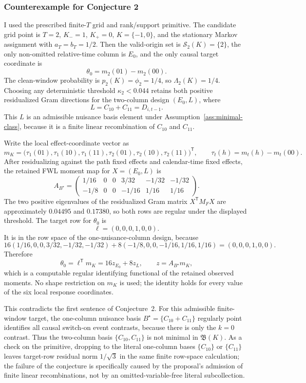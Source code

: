 \documentclass[11pt]{article}
\newcommand{\transpose}{\mathsf{T}}
\theoremstyle{definition}
\theoremstyle{plain}
\theoremstyle{remark}
\begin{document}
\subsubsection*{Counterexample for Conjecture 2}
I used the prescribed finite-\(T\) grid and rank/support primitive.
The candidate grid point is \(T=2\), \(K_- =1\), \(K_+=0\), \(K=\{-1,0\}\), and the stationary Markov assignment with \(a_T=b_T=1/2\).
Then the valid-origin set is \(\mathcal S_2(K)=\{2\}\), the only non-omitted relative-time column is \(E_0\), and the only causal target coordinate is
\[
\theta_0=m_2(01)-m_2(00).
\]
The clean-window probability is \(p_2(K)=\phi_2=1/4\), so \(\Lambda_2(K)=1/4\).
Choosing any deterministic threshold \(\kappa_2<0.044\) retains both positive residualized Gram directions for the two-column design \((E_0,L)\), where
\[
L=C_{10}+C_{11}=D_{i,t-1}.
\]
This \(L\) is an admissible nuisance basis element under Assumption~\ref{ass:minimal-class}, because it is a finite linear recombination of \(C_{10}\) and \(C_{11}\).

Write the local effect-coordinate vector as
\[
m_K=
\bigl(
\tau_1(01),\tau_1(10),\tau_1(11),
\tau_2(01),\tau_2(10),\tau_2(11)
\bigr)^\transpose,
\qquad
\tau_t(h)=m_t(h)-m_t(00).
\]
After residualizing against the path fixed effects and calendar-time fixed effects, the retained FWL moment map for \(X=(E_0,L)\) is
\[
A_{B^\star}=
\begin{pmatrix}
1/16 & 0 & 0 & 3/32 & -1/32 & -1/32\\
-1/8 & 0 & 0 & -1/16 & 1/16 & 1/16
\end{pmatrix}.
\]
The two positive eigenvalues of the residualized Gram matrix \(X^\transpose M_FX\) are approximately \(0.04495\) and \(0.17380\), so both rows are regular under the displayed threshold.
The target row for \(\theta_0\) is
\[
\ell=(0,0,0,1,0,0).
\]
It is in the row space of the one-nuisance-column design, because
\[
16(1/16,0,0,3/32,-1/32,-1/32)
+8(-1/8,0,0,-1/16,1/16,1/16)
=(0,0,0,1,0,0).
\]
Therefore
\[
\theta_0=\ell^\transpose m_K
=16 z_{E_0}+8 z_L,
\qquad
z=A_{B^\star}m_K,
\]
which is a computable regular identifying functional of the retained observed moments.
No shape restriction on \(m_K\) is used; the identity holds for every value of the six local response coordinates.

This contradicts the first sentence of Conjecture~2.
For this admissible finite-window target, the one-column nuisance basis \(B^\star=\{C_{10}+C_{11}\}\) regularly point identifies all causal switch-on event contrasts, because there is only the \(k=0\) contrast.
Thus the two-column basis \(\{C_{10},C_{11}\}\) is not minimal in \(\mathfrak B(K)\).
As a check on the primitive, dropping to the literal one-column bases \(\{C_{10}\}\) or \(\{C_{11}\}\) leaves target-row residual norm \(1/\sqrt{3}\) in the same finite row-space calculation; the failure of the conjecture is specifically caused by the proposal's admission of finite linear recombinations, not by an omitted-variable-free literal subcollection.
\end{document}
